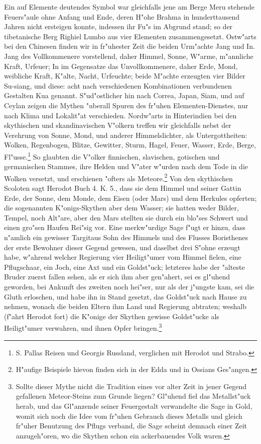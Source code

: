 \documentclass[a4paper, 11pt, oneside, polutonikogreek, german]{article}
\begin{document}
Ein auf Elemente deutendes Symbol war gleichfalls jene am Berge Meru stehende Feuers"aule ohne Anfang und Ende, deren H"ohe Brahma in hunderttausend Jahren nicht ersteigen konnte, indessen ihr Fu"s im Abgrund stand; so der tibetanische Berg Righiel Lumbo aus vier Elementen zusammengesetzt. Ostw"arts bei den Chinesen finden wir in fr"uhester Zeit die beiden Urm"achte Jang und In. Jang des Vollkommenere vorstellend, daher Himmel, Sonne, W"arme, m"annliche Kraft, Urfeuer; In im Gegensatze das Unvollkommenere, daher Erde, Mond, weibliche Kraft, K"alte, Nacht, Urfeuchte; beide M"achte erzeugten vier Bilder Su-siang, und diese: acht nach verschiedenen Kombinationen verbundenen Gestalten Kua genannt. S"ud"ostlicher hin nach Correa, Japan, Siam, und auf Ceylan zeigen die Mythen "uberall Spuren des fr"uhen Elementen-Dienstes, nur nach Klima und Lokalit"at verschieden. Nordw"arts in Hinterindien bei den skythischen und skandinavischen V"olkern treffen wir gleichfalls nebst der Verehrung von Sonne, Mond, und anderer Himmelslichter, als Untergottheiten: Wolken, Regenbogen, Blitze, Gewitter, Sturm, Hagel, Feuer, Wasser, Erde, Berge, Fl"usse.\footnote{S. Pallas Reisen und Georgis Russland, verglichen mit Herodot und Strabo.} So glaubten die V"olker finnischen, slavischen, gotischen und germanischen Stammes, ihre Helden und V"ater w"urden nach dem Tode in die Wolken versetzt, und erschienen "ofters als Meteore.\footnote{H"aufige Beispiele hievon finden sich in der Edda und in Ossians Ges"angen.} Von den skythischen Scoloten sagt Herodot Buch 4. K. 5., dass sie dem Himmel und seiner Gattin Erde, der Sonne, dem Monde, dem Eisen (oder Mars) und dem Herkules opferten; die sogenannten K"onigs-Skythen aber dem Wasser; sie hatten weder Bilder, Tempel, noch Alt"are, aber den Mars stellten sie durch ein blo"ses Schwert und einen gro"sen Haufen Rei"sig vor. Eine merkw"urdige Sage f"ugt er hinzu, dass n"amlich ein gewisser Targitaus Sohn des Himmels und des Flusses Boristhenes der erste Bewohner dieser Gegend gewesen, und daselbst drei S"ohne erzeugt habe, w"ahrend welcher Regierung vier Heiligt"umer vom Himmel fielen, eine Pflugschaar, ein Joch, eine Axt und ein Goldst"uck; letzteres habe der "alteste Bruder zuerst fallen sehen, als er sich ihm aber gen"ahert, sei es gl"uhend geworden, bei Ankunft des zweiten noch hei"ser, nur als der j"ungste kam, sei die Gluth erloschen, und habe ihn in Stand gesetzt, das Goldst"uck nach Hause zu nehmen, wonach die beiden Eltern ihm Land und Regierung abtraten; weshalb (f"ahrt Herodot fort) die K"onige der Skythen gewisse Goldst"ucke als Heiligt"umer verwahren, und ihnen Opfer bringen.\footnote{Sollte dieser Mythe nicht die Tradition eines vor alter Zeit in jener Gegend gefallenen Meteor-Steins zum Grunde liegen? Gl"uhend fiel das Metallst"uck herab, und das Gl"anzende seiner Feuergestalt verwandelte die Sage in Gold, womit sich noch die Idee vom fr"uhen Gebrauch dieses Metalls und gleich fr"uher Benutzung des Pflugs verband, die Sage scheint demnach einer Zeit anzugeh"oren, wo die Skythen schon ein ackerbauendes Volk waren.}
\end{document}
